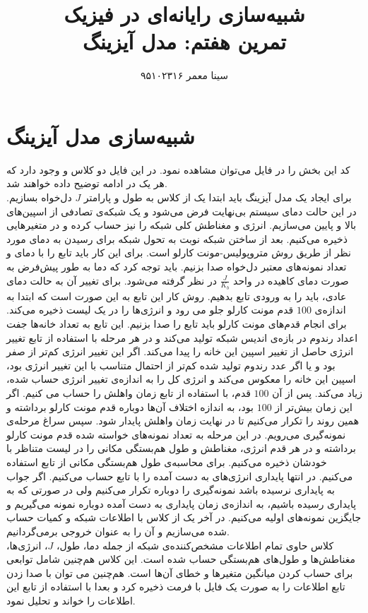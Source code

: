 \documentclass[11pt, a4paper]{article}
\title{\textbf{شبیه‌سازی رایانه‌ای در فیزیک}\\تمرین هفتم: مدل آیزینگ}
\author{سینا معمر ۹۵۱۰۲۳۱۶}
\begin{document}
\maketitle
\thispagestyle{empty}


\section{\textbf{شبیه‌سازی مدل آیزینگ}}
کد این بخش را در فایل
می‌توان مشاهده نمود.
در این فایل دو کلاس
و
وجود دارد که هر یک در ادامه توضیح داده خواهند شد.
\\
برای ایجاد یک مدل آیزینگ باید ابتدا یک
از کلاس
به طول و پارامتر
$J$
دل‌خواه بسازیم.
در این حالت دمای سیستم بی‌نهایت فرض می‌شود و یک شبکه‌ی تصادفی از اسپین‌های بالا و پایین می‌سازیم.
انرژی و مغناطش کلی شبکه را نیز حساب کرده و در متغیر‌هایی ذخیره می‌کنیم.
بعد از ساختن شبکه نوبت به تحول شبکه برای رسیدن به دمای مورد نظر از طریق روش متروپولیس-مونت کارلو است.
برای این کار باید تابع
را با دمای و تعداد نمونه‌های معتبر دل‌خواه صدا بزنیم.
باید توجه کرد که دما به طور پیش‌فرض به صورت دمای کاهیده در واحد
$\frac{J}{K_b}$
در نظر گرفته می‌شود.
برای تغییر آن به حالت دمای عادی، باید
را به ورودی تابع بدهیم.
روش کار این تابع به این صورت است که ابتدا به اندازه‌ی
$100$
قدم مونت‌ کارلو جلو می رود و انرژی‌ها را در یک لیست ذخیره می‌کند.
برای انجام قدم‌های مونت کارلو باید تابع
را صدا بزنیم.
این تابع به تعداد خانه‌ها جفت اعداد رندوم در بازه‌ی اندیس شبکه تولید می‌کند و در هر مرحله
با استفاده از تابع
تغییر انرژی حاصل از تغییر اسپین این خانه را پیدا می‌کند.
اگر این تغییر انرژی کم‌تر از صفر بود و یا اگر عدد رندوم تولید شده کم‌تر از احتمال متناسب با این تغییر انرژی بود،
اسپین این خانه را معکوس می‌کند و انرژی کل را به اندازه‌ی تغییر انرژی حساب شده،
زیاد می‌کند.
پس از آن
$100$
قدم،
 با استفاده از تابع
زمان واهلش را حساب می کنیم.
اگر این زمان بیش‌تر از
$100$
بود، به اندازه اختلاف آن‌ها دوباره قدم مونت کارلو برداشته و همین روند را تکرار می‌کنیم تا در نهایت زمان واهلش پایدار شود.
سپس سراغ مرحله‌ی نمونه‌گیری می‌رویم.
در این مرحله به تعداد نمونه‌های خواسته شده قدم مونت کارلو برداشته و در هر قدم انرژی، مغناطش و طول هم‌بستگی مکانی را
در لیست متناظر با خودشان ذخیره می‌کنیم.
برای محاسبه‌ی طول هم‌بستگی مکانی از تابع
استفاده می‌کنیم.
در انتها پایداری انرژی‌های به دست آمده را با تابع
حساب می‌کنیم.
اگر جواب به پایداری نرسیده باشد نمونه‌گیری را دوباره تکرار می‌کنیم ولی در صورتی که به پایداری رسیده باشیم،
به اندازه‌ی زمان پایداری به دست آمده دوباره نمونه می‌گیریم و جایگزین نمونه‌های اولیه می‌کنیم.
در آخر یک
از کلاس
با اطلاعات شبکه و کمیات حساب شده می‌سازیم و آن را به عنوان خروجی برمی‌گردانیم.
\\
کلاس
حاوی تمام اطلاعات مشخص‌کننده‌ی شبکه از جمله دما، طول،
$J$،
انرژی‌ها، مغناطش‌ها و طول‌های هم‌بستگی‌ حساب شده است.
این کلاس هم‌چنین شامل توابعی برای حساب کردن
میانگین متغیر‌ها و خطای آن‌ها است.
هم‌چنین می توان با صدا زدن تابع
اطلاعات را به صورت یک فایل با فرمت
ذخیره کرد و بعدا با استفاده از تابع
این اطلاعات را خواند و تحلیل نمود.
\end{document}
